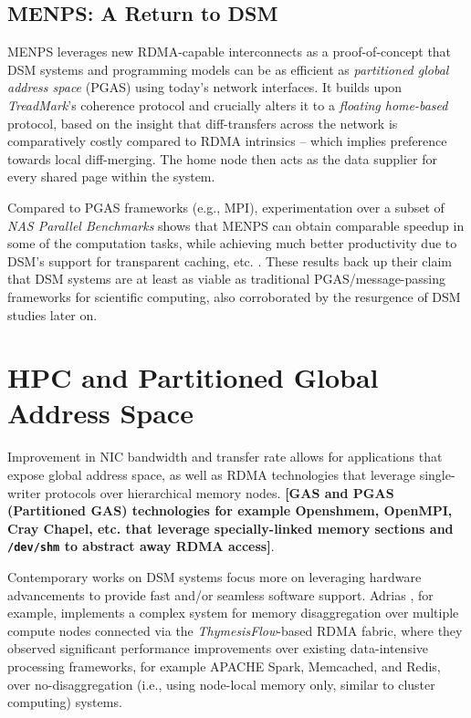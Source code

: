 \documentclass{article}
\begin{document}
\subsection{MENPS: A Return to DSM}
MENPS\cite{Endo_Sato_Taura.MENPS_DSM.2020} leverages new RDMA-capable
interconnects as a proof-of-concept that DSM systems and programming models can
be as efficient as \textit{partitioned global address space} (PGAS) using today's
network interfaces. It builds upon \textit{TreadMark}'s
\cite{Amza_etal.Treadmarks.1996} coherence protocol and crucially alters it to
a \textit{floating home-based} protocol, based on the insight that diff-transfers
across the network is comparatively costly compared to RDMA intrinsics -- which
implies preference towards local diff-merging. The home node then acts as the
data supplier for every shared page within the system.

Compared to PGAS frameworks (e.g., MPI), experimentation over a subset of
\textit{NAS Parallel Benchmarks} shows that MENPS can obtain comparable speedup
in some of the computation tasks, while achieving much
better productivity due to DSM's support for transparent caching, etc.
\cite{Endo_Sato_Taura.MENPS_DSM.2020}. These results back up their claim that
DSM systems are at least as viable as traditional PGAS/message-passing frameworks
for scientific computing, also corroborated by the resurgence of DSM studies
later on\cite{Masouros_etal.Adrias.2023}.

\section{HPC and Partitioned Global Address Space}
Improvement in NIC bandwidth and transfer rate allows for applications that expose
global address space, as well as RDMA technologies that leverage single-writer
protocols over hierarchical memory nodes. \textbf{[GAS and PGAS (Partitioned GAS)
technologies for example Openshmem, OpenMPI, Cray Chapel, etc. that leverage
specially-linked memory sections and \texttt{/dev/shm} to abstract away RDMA access]}.


Contemporary works on DSM systems focus more on leveraging hardware advancements
to provide fast and/or seamless software support. Adrias \cite{Masouros_etal.Adrias.2023},
for example, implements a complex system for memory disaggregation over multiple
compute nodes connected via the \textit{ThymesisFlow}-based RDMA fabric, where
they observed significant performance improvements over existing data-intensive
processing frameworks, for example APACHE Spark, Memcached, and Redis, over
no-disaggregation (i.e., using node-local memory only, similar to cluster computing)
systems.
\end{document}
